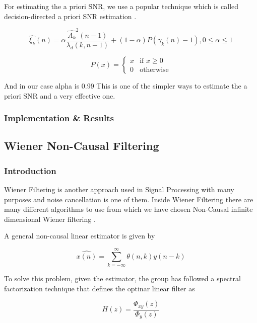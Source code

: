 \documentclass[11pt,a4paper,english]{book}  %
\theoremstyle{definition}  %
\theoremstyle{plain}  %
\theoremstyle{remark}  %
\begin{document}
	
	For estimating the a priori SNR, we use a popular technique which is called decision-directed a priori SNR estimation \citep{speech}.
	
		\begin{equation}
		\hat{\xi_{k}}(n)= \alpha \frac{\hat{A_{k}}^2 (n-1)}{\lambda_{d} (k,n-1)} + (1-\alpha) P(\gamma_{k}(n)-1), 0 \leq \alpha \leq 1
	\end{equation}
	
	
	\[
 P(x) =
  \begin{cases}
   x & \text{if } x \geq 0 \\
   0       & \text{otherwise}
  \end{cases}
\]
	
	And in our case alpha is 0.99
This is one of the simpler ways to estimate the a priori SNR and a very effective one.
	
	\subsubsection{Implementation \& Results}


	\subsection{Wiener Non-Causal Filtering}
	
	\subsubsection{Introduction}
	
	
	Wiener Filtering is another approach used in Signal Processing with many purposes and noise cancellation is one of them. Inside Wiener Filtering there are many different algorithms to use from which we have chosen Non-Causal infinite dimensional Wiener filtering \cite{asp}.
	
	A general non-causal linear estimator is given by 
	
	
	\begin{equation}
	\label{eq:nonc1}
		\hat{x(n)} = \sum \limits_{k=-\infty}^\infty \theta(n,k)y(n-k)
	\end{equation}
	
	To solve this problem, given the estimator, the group has followed a spectral factorization technique that defines the optinar linear filter as
	
		\begin{equation}
	\label{eq:nonc1}
		H(z)=\frac{\Phi_{xy}(z)}{\Phi_{y}(z)}
	\end{equation}
	
\end{document}
